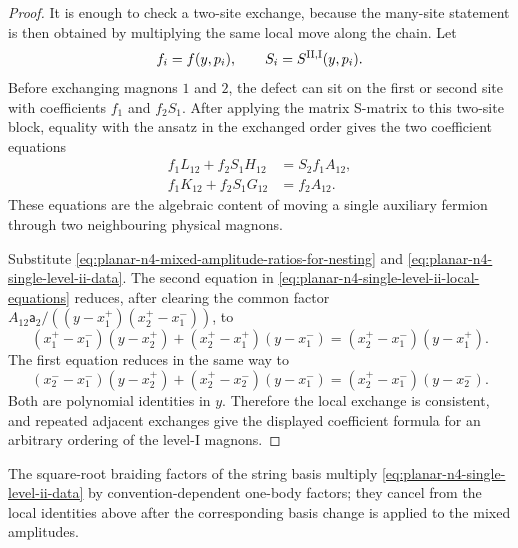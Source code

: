 \begin{proof}
It is enough to check a two-site exchange, because the many-site statement is
then obtained by multiplying the same local move along the chain.  Let
\[
  f_i=f(y,p_i),
  \qquad
  S_i=S^{{\rm II},{\rm I}}(y,p_i).
\]
Before exchanging magnons \(1\) and \(2\), the defect can sit on the first
or second site with coefficients \(f_1\) and \(f_2S_1\).  After applying the
matrix S-matrix to this two-site block, equality with the ansatz in the
exchanged order gives the two coefficient equations
\begin{equation}
\begin{aligned}
  f_1L_{12}+f_2S_1H_{12}
  &=
  S_2f_1A_{12},\\
  f_1K_{12}+f_2S_1G_{12}
  &=
  f_2A_{12}.
\end{aligned}
  \label{eq:planar-n4-single-level-ii-local-equations}
\end{equation}
These equations are the algebraic content of moving a single auxiliary
fermion through two neighbouring physical magnons.

Substitute \eqref{eq:planar-n4-mixed-amplitude-ratios-for-nesting} and
\eqref{eq:planar-n4-single-level-ii-data}.  The second equation in
\eqref{eq:planar-n4-single-level-ii-local-equations} reduces, after
clearing the common factor
\(A_{12}\mathsf a_2/((y-x_1^+)(x_2^+-x_1^-))\), to
\[
  (x_1^+-x_1^-)(y-x_2^+)
  +(x_2^+-x_1^+)(y-x_1^-)
  =
  (x_2^+-x_1^-)(y-x_1^+).
\]
The first equation reduces in the same way to
\[
  (x_2^--x_1^-)(y-x_2^+)
  +(x_2^+-x_2^-)(y-x_1^-)
  =
  (x_2^+-x_1^-)(y-x_2^-).
\]
Both are polynomial identities in \(y\).  Therefore the local exchange is
consistent, and repeated adjacent exchanges give the displayed coefficient
formula for an arbitrary ordering of the level-I magnons.
\end{proof}

The square-root braiding factors of the string basis multiply
\eqref{eq:planar-n4-single-level-ii-data} by convention-dependent one-body
factors; they cancel from the local identities above after the corresponding
basis change is applied to the mixed amplitudes.

